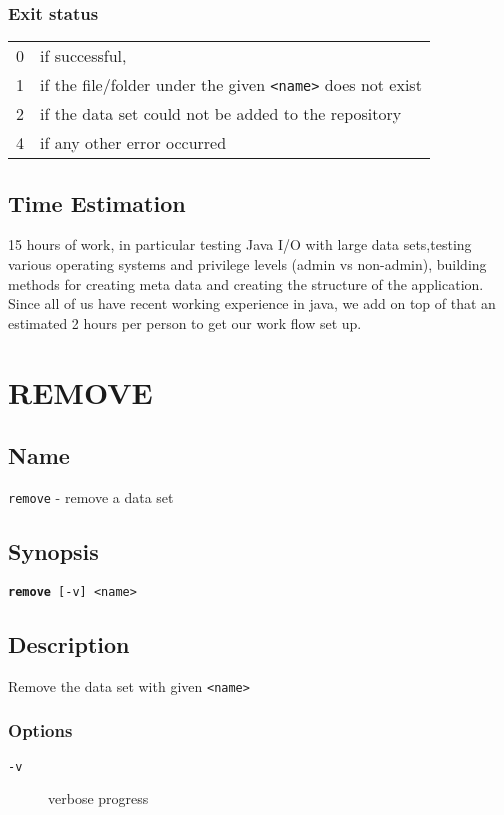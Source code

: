 \documentclass{article} %
\begin{document}
		\subsubsection*{Exit status}
		\begin{tabular}{ll}
			0 &  if successful,\\ 
			1 &  if the file/folder under the given \texttt{<name>} does not exist\\ 
			2 &  if the data set could not be added to the repository\\
			4 &  if any other error occurred\\
		\end{tabular}
		
		\subsection*{Time Estimation}
		15 hours of work, in particular testing Java I/O with large data sets,testing various operating systems and privilege levels (admin vs non-admin), building methods for creating meta data and creating the structure of the application. \\
		\noindent Since all of us have recent working experience in java, we add on top of that an estimated 2 hours per person to get our work flow set up.
		\newpage
		\section*{REMOVE}
		\subsection*{Name}
		\texttt{remove} - remove a data set
		\subsection*{Synopsis}
		\texttt{\textbf{remove} [-v] <name>}
		\subsection*{Description}
		Remove the data set with given \texttt{<name>}\\
		
		\noindent
		\subsubsection*{Options}
		\begin{description}
			\item[\texttt{-v}] verbose progress
		\end{description}
		
\end{document}
